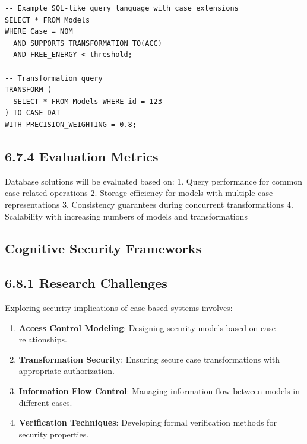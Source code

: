 \documentclass[
  11pt,
  letterpaper,
]{article}
\providecommand{\tightlist}{%
  \setlength{\itemsep}{0pt}\setlength{\parskip}{0pt}}
\begin{document}
\begin{verbatim}
-- Example SQL-like query language with case extensions
SELECT * FROM Models
WHERE Case = NOM
  AND SUPPORTS_TRANSFORMATION_TO(ACC)
  AND FREE_ENERGY < threshold;

-- Transformation query
TRANSFORM (
  SELECT * FROM Models WHERE id = 123
) TO CASE DAT
WITH PRECISION_WEIGHTING = 0.8;
\end{verbatim}

\hypertarget{evaluation-metrics-1}{%
\subsection{6.7.4 Evaluation Metrics}\label{evaluation-metrics-1}}

Database solutions will be evaluated based on: 1. Query performance for
common case-related operations 2. Storage efficiency for models with
multiple case representations 3. Consistency guarantees during
concurrent transformations 4. Scalability with increasing numbers of
models and transformations

\hypertarget{cognitive-security-frameworks}{%
\subsection{Cognitive Security
Frameworks}\label{cognitive-security-frameworks}}

\hypertarget{research-challenges-1}{%
\subsection{6.8.1 Research Challenges}\label{research-challenges-1}}

Exploring security implications of case-based systems involves:

\begin{enumerate}
\def\labelenumi{\arabic{enumi}.}
\tightlist
\item
  \textbf{Access Control Modeling}: Designing security models based on
  case relationships.
\item
  \textbf{Transformation Security}: Ensuring secure case transformations
  with appropriate authorization.
\item
  \textbf{Information Flow Control}: Managing information flow between
  models in different cases.
\item
  \textbf{Verification Techniques}: Developing formal verification
  methods for security properties.
\end{enumerate}
\end{document}
